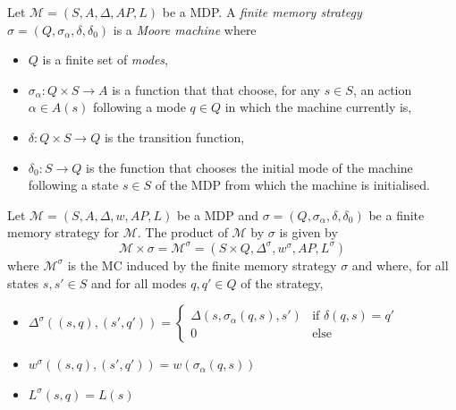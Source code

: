 \begin{definition}
Let $\mathcal{M} = (S, A, \Delta, AP, L)$ be a MDP.
A \textit{finite memory strategy} $\sigma = (Q, \sigma_\alpha, \delta, \delta_0)$ is a \textit{Moore machine} where
\begin{itemize}
	\item $Q$ is a finite set of \textit{modes},
	\item $\sigma_\alpha : Q \times S \rightarrow A$ is a function that that choose, for any $s \in S$, an action $\alpha \in A(s)$ following a mode $q \in Q$ in which the machine currently is,
	\item $\delta: Q \times S \rightarrow Q$ is the transition function,
	\item $\delta_0 : S \rightarrow Q$ is the function that chooses the initial mode of the machine following a state $s \in S$ of the MDP from which the machine is initialised.
\end{itemize}
\end{definition}

\begin{definition}
Let $\mathcal{M} = (S, A, \Delta, w, AP, L)$ be a MDP and $\sigma = (Q, \sigma_\alpha, \delta, \delta_0)$ be a finite memory strategy for $\mathcal{M}$.
The product of $\mathcal{M}$ by $\sigma$ is given by
\[ \mathcal{M} \times \sigma = \mathcal{M}^\sigma = (S \times Q, \Delta^\sigma, w^\sigma, AP, L^\sigma) \]
where $\mathcal{M}^\sigma$ is the MC induced by the finite memory strategy $\sigma$ and where,
for all states $s, s' \in S$ and for all modes $q, q' \in Q$ of the strategy,
\begin{itemize}
	\item $\Delta^\sigma((s, q), (s', q')) =
	\begin{cases}
	\Delta(s, \sigma_\alpha(q, s), s') & \text{if } \delta(q, s) = q'\\
	0  & \text{else}
	\end{cases}$
  \item $w^\sigma((s, q), (s', q')) = w(\sigma_\alpha(q, s))$
  \item $L^\sigma(s, q) = L(s)$
\end{itemize}
\end{definition}

